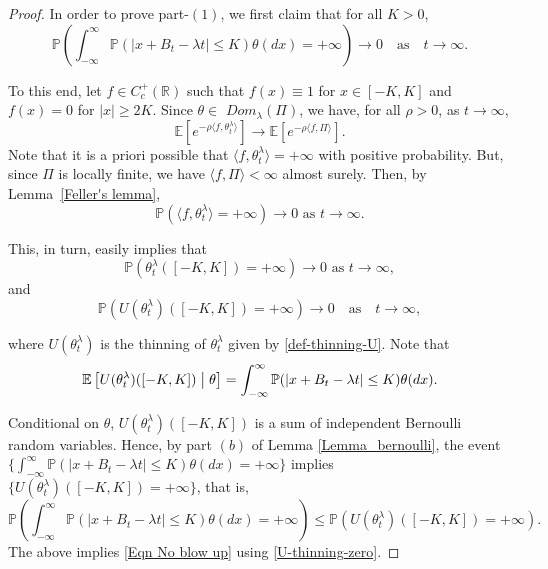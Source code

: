 \documentclass[a4paper,reqno]{amsart}%
\newcommand{\1}{\mathbf 1}
\theoremstyle{mine}
\numberwithin{theorem}{section}
\numberwithin{equation}{section}
\theoremstyle{remark}
\begin{document}
\begin{proof}
    In order to prove part-$(1)$, we first claim that for all $K >0$,
\begin{equation}\label{Eqn No blow up}
        \mathbb{P}\left(\int_{-\infty}^{\infty}\mathbb{P}(|x+B_{t}-\lambda t|\le K)\theta(dx) = +\infty  \right) \longrightarrow 0 \quad \text{as}\quad t\to\infty.
    \end{equation}
    
To this end, let $f \in C^{+}_{c}(\mathbb{R})$ such that $f(x)\equiv 1$ for $x \in [-K,K]$ and $f(x) = 0$ for $|x| \geq 2K$. Since $\theta \in $ $Dom_{\lambda}(\Pi)$, we have, for all $\rho>0$, as $t\to\infty$,
    \begin{equation}\label{apply-domain-condition}
        \mathbb{E}\left[e^{-\rho\langle f,\theta_t^\lambda \rangle} \right]\longrightarrow \mathbb{E}\left[e^{-\rho\langle f,\Pi \rangle} \right].
    \end{equation}
    Note that it is a priori possible that $\langle f,\theta_t^\lambda \rangle = +\infty$ with positive probability. But, since $\Pi$ is locally finite, we have $\langle f,\Pi \rangle<\infty$ almost surely. Then, by Lemma~\ref{Feller's lemma},
\[       \mathbb{P}\left(\langle f,\theta_t^\lambda \rangle = +\infty \right)\longrightarrow 0  \textrm{ as } t \to \infty.
\]

This, in turn, easily implies that 
\[\mathbb{P}\left(\theta^\lambda_t([-K,K]) = +\infty \right) \to 0 \textrm{ as } t \to \infty,\]
and 
\begin{equation}\label{U-thinning-zero}
        \mathbb{P}\left(U(\theta^\lambda_t)([-K,K]) = +\infty \right) \longrightarrow 0 \quad \text{as}\quad t \to\infty,
    \end{equation}
    
where $U(\theta_t^\lambda)$ is the thinning of $\theta^\lambda_t$ given by \eqref{def-thinning-U}. Note that 
    \begin{equation}\label{U-conditional-expectation}
        \mathbb{E}\left[U(\theta^\lambda_t)([-K,K]) \hspace{1mm}\bigl| \hspace{1mm}\theta \right] = \int_{-\infty}^{\infty}\mathbb{P}(|x+B_{t}-\lambda t| \le K)\theta(dx).
    \end{equation}

    Conditional on $\theta$, $U(\theta^\lambda_t)([-K,K])$ is a sum of independent Bernoulli random variables. Hence, by part $(b)$ of Lemma \ref{Lemma_bernoulli}, the event $\{ \int_{-\infty}^{\infty}\mathbb{P}(|x+B_{t}-\lambda t| \le K)\theta(dx) = +\infty\} $ implies $\{U(\theta^\lambda_t)([-K,K]) = +\infty\}$, that is,
     \begin{equation}
        \mathbb{P}\left(\int_{-\infty}^{\infty}\mathbb{P}(|x+B_{t}-\lambda t|\le K)\theta(dx) = +\infty  \right) \le \mathbb{P}\left( U(\theta_t^\lambda)([-K,K]) = +\infty \right).
    \end{equation}
The above implies \eqref{Eqn No blow up} using \eqref{U-thinning-zero}.
    


\end{proof}
\end{document}
